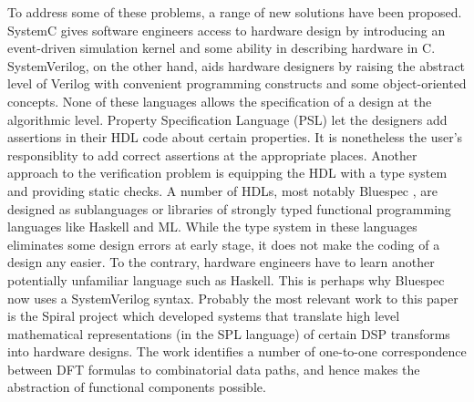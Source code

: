 To address some of these problems, a range of new solutions have been
proposed.
SystemC\cite{Grotker-sysC} gives software engineers access to hardware
design by
introducing an event-driven simulation
kernel and some ability in describing hardware in C.
SystemVerilog\cite{Sutherland-systemverilog}, on the other hand, aids hardware designers by raising
the abstract level of Verilog with convenient programming constructs and
some object-oriented concepts. None of these
languages allows the specification of a design at the algorithmic level.
Property Specification Language (PSL) let the designers
add assertions in their HDL code about certain properties.
It is nonetheless the user's responsiblity to add correct assertions
at the appropriate places. Another approach to the verification
problem is equipping the HDL with a type system and providing static checks.
A number of HDLs, most notably Bluespec \cite{Arvind03:bluespec},
are designed as sublanguages or
libraries of strongly typed functional programming languages like Haskell\cite{HaskellBook} and ML\cite{ML:Milner}.
While the type system in these languages eliminates some design errors at early stage,
it does not make the coding of a design any easier. To the contrary, hardware
engineers have to learn another potentially unfamiliar language such as Haskell.
This is perhaps why Bluespec now uses a SystemVerilog syntax.
Probably the most relevant work to this paper is the Spiral project \cite{NordinMHP05:Spiral}
which developed systems that translate high level mathematical representations
(in the SPL language)
of certain DSP transforms into hardware designs.
The work identifies a number of one-to-one correspondence between DFT formulas to
combinatorial data paths, and hence makes the abstraction of functional components possible.


